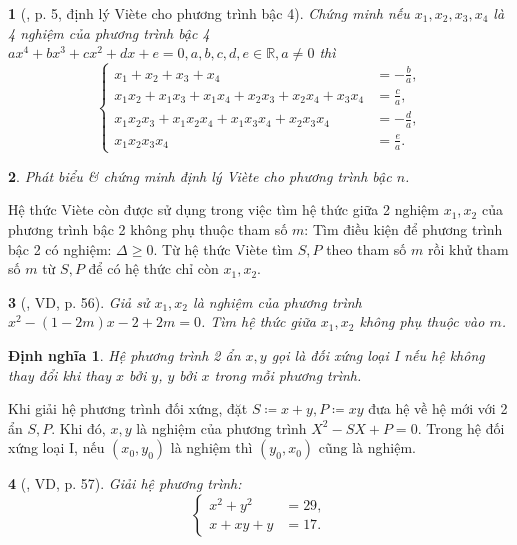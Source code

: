 \documentclass{article}
\newtheorem{baitoan}{}
\newtheorem{dinhnghia}{Định nghĩa}
\begin{document}
\begin{baitoan}[\cite{Binh_boi_duong_Toan_9_tap_2}, p. 5, định lý Vi\`ete cho phương trình bậc 4]
	Chứng minh nếu $x_1,x_2,x_3,x_4$ là 4 nghiệm của phương trình bậc 4 $ax^4 + bx^3 + cx^2 + dx + e = 0,a,b,c,d,e\in\mathbb{R},a\ne0$ thì
	\begin{equation*}
		\left\{\begin{split}
			x_1 + x_2 + x_3 + x_4 &= -\frac{b}{a},\\
			x_1x_2 + x_1x_3 + x_1x_4 + x_2x_3 + x_2x_4 + x_3x_4 &= \frac{c}{a},\\
			x_1x_2x_3 + x_1x_2x_4 + x_1x_3x_4 + x_2x_3x_4 &= -\frac{d}{a},\\
			x_1x_2x_3x_4 &= \frac{e}{a}.
		\end{split}\right.
	\end{equation*}
\end{baitoan}

\begin{baitoan}
	Phát biểu \& chứng minh định lý Vi\`ete cho phương trình bậc $n$.
\end{baitoan}
Hệ thức Vi\`ete còn được sử dụng trong việc tìm hệ thức giữa 2 nghiệm $x_1,x_2$ của phương trình bậc 2 không phụ thuộc tham số $m$: Tìm điều kiện để phương trình bậc 2 có nghiệm: $\Delta\ge0$. Từ hệ thức Vi\`ete tìm $S,P$ theo tham số $m$ rồi khử tham số $m$ từ $S,P$ để có hệ thức chỉ còn $x_1,x_2$.

\begin{baitoan}[\cite{Binh_boi_duong_Toan_9_tap_2}, VD, p. 56]
	Giả sử $x_1,x_2$ là nghiệm của phương trình $x^2 - (1 - 2m)x - 2 + 2m = 0$. Tìm hệ thức giữa $x_1,x_2$ không phụ thuộc vào $m$.
\end{baitoan}

\begin{dinhnghia}
	Hệ phương trình 2 ẩn $x,y$ gọi là {đối xứng loại I} nếu hệ không thay đổi khi thay $x$ bởi $y$, $y$ bởi $x$ trong mỗi phương trình.
\end{dinhnghia}
Khi giải hệ phương trình đối xứng, đặt $S\coloneqq x + y,P\coloneqq xy$ đưa hệ về hệ mới với 2 ẩn $S,P$. Khi đó, $x,y$ là nghiệm của phương trình $X^2 - SX + P = 0$. Trong hệ đối xứng loại I, nếu $(x_0,y_0)$ là nghiệm  thì $(y_0,x_0)$ cũng là nghiệm.

\begin{baitoan}[\cite{Binh_boi_duong_Toan_9_tap_2}, VD, p. 57]
	Giải hệ phương trình:
	\begin{equation*}
		\left\{\begin{split}
			x^2 + y^2 &= 29,\\
			x + xy + y &= 17.
		\end{split}\right.
	\end{equation*}
\end{baitoan}
\end{document}
